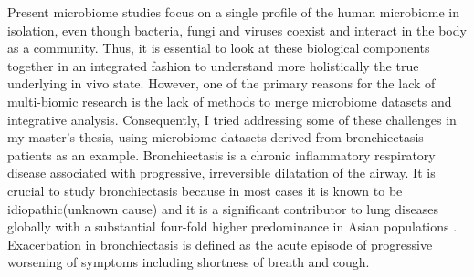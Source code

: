 Present microbiome studies focus on a single profile of the human microbiome in isolation, even though bacteria, fungi and viruses coexist and interact in the body as a community. Thus, it is essential to look at these biological components together in an integrated fashion to understand more holistically the true underlying in vivo state. However, one of the primary reasons for the lack of multi-biomic research is the lack of methods to merge microbiome datasets and integrative analysis. Consequently, I tried addressing some of these challenges in my master's thesis, using microbiome datasets derived from bronchiectasis patients as an example. Bronchiectasis is a chronic inflammatory respiratory disease associated with progressive, irreversible dilatation of the airway. It is crucial to study bronchiectasis because in most cases it is known to be idiopathic(unknown cause) \cite{pmid29478908} and it is a significant contributor to lung diseases globally with a substantial four-fold higher predominance in Asian populations \cite{Seitz2012}. Exacerbation in bronchiectasis is defined as the acute episode of progressive worsening of symptoms including shortness of breath and cough. 
